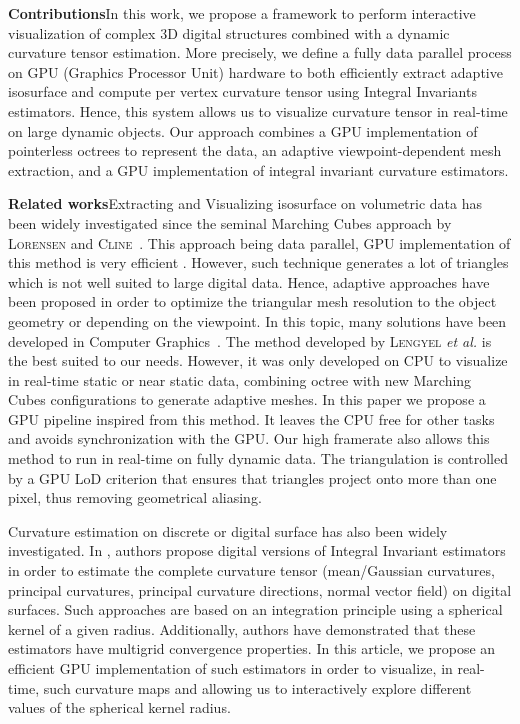 \documentclass{llncs}
\begin{document}
\noindent\textbf{Contributions}\quad In this work, we propose a framework to
perform interactive visualization of complex 3D digital structures combined with
a dynamic curvature tensor estimation. More precisely, we define a fully data
parallel process on GPU (Graphics Processor Unit) hardware to both efficiently
extract adaptive isosurface and compute per vertex curvature tensor using
Integral Invariants estimators. Hence, this system allows us to visualize
curvature tensor in real-time on large dynamic objects. Our approach combines a
GPU implementation of pointerless octrees to represent the data, an adaptive
viewpoint-dependent mesh extraction, and a GPU implementation of integral
invariant curvature estimators.


\vspace{0.2cm}

\sloppy\noindent\textbf{Related works}\quad Extracting and Visualizing
isosurface on volumetric data has been widely investigated since the
seminal Marching Cubes approach by \textsc{Lorensen} and
\textsc{Cline}~\cite{lorensen1987marching}. This approach being data parallel,
GPU implementation of this method is very efficient
\cite{tatarchuk2007real}. However, such technique generates a lot of
triangles which is not well suited to large digital data. Hence,
adaptive approaches have been proposed in order to optimize the
triangular mesh resolution to the object geometry or depending on the
viewpoint. In this topic, many solutions have been developed in
Computer
Graphics~\cite{shu1995adaptive,schaefer2004dual,lengyel2010voxel,DBLP:journals/cgf/LewinerMPPL10,DBLP:journals/cvgip/LobelloDD14}.
The method developed by \textsc{Lengyel} \textit{et al.}
\cite{lengyel2010voxel} is the best suited to our needs.  However, it
was only developed on CPU to visualize in real-time static or near
static data, combining octree with new Marching Cubes configurations
to generate adaptive meshes. In this paper we propose a GPU pipeline
inspired from this method.  It leaves the CPU free for other tasks and
avoids synchronization with the GPU.  Our high framerate also allows
this method to run in real-time on fully dynamic data.  The
triangulation is controlled by a GPU LoD criterion that ensures that
triangles project onto more than one pixel, thus removing geometrical
aliasing.

Curvature estimation on discrete or digital surface has also been
widely investigated. In \cite{CVIU2014}, authors propose digital
versions of Integral Invariant estimators
\cite{Pottmann2007,Pottmann2009} in order to estimate the complete
curvature tensor (mean/Gaussian curvatures, principal curvatures,
principal curvature directions, normal vector field) on digital
surfaces. Such approaches are based on an integration principle using
a spherical kernel of a given radius. Additionally, authors have
demonstrated that these estimators have multigrid convergence
properties. In this article, we propose an efficient GPU
implementation of such estimators in order to visualize, in real-time,
such curvature maps and allowing us to interactively explore different
values of the spherical kernel radius.
\end{document}
